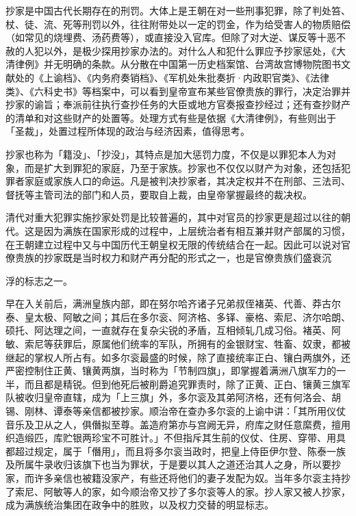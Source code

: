 抄家是中国古代长期存在的刑罚。大体上是王朝在对一些刑事犯罪，除了判处笞、杖、徒、流、死等刑罚以外，往往附带处以一定的罚金，作为给受害人的物质赔偿（如常见的烧埋费、汤药费等），或直接没入官库。但除了对大逆、谋反等十恶不赦的人犯以外，是极少探用抄家办法的。对什么人和犯什么罪应予抄家惩处，《大清律例》并无明确的条款。从分散在中国第一历史档案馆、台湾故宫博物院图书文献处的《上谕档》、《内务府奏销档》、《军机处朱批奏折·内政职官类》、《法律类》、《六科史书》等档案中，可以看到皇帝宣布某些官僚贵族的罪行，决定治罪并抄家的谕旨；奉派前往执行查抄任务的大臣或地方官奏报查抄经过；还有查抄财产的清单和对这些财产的处置等。处理方式有些是依据《大清律例》，有些则出于「圣裁」，处置过程所体现的政治与经济因素，值得思考。

抄家也称为「籍没」、「抄没」，其特点是加大惩罚力度，不仅是以罪犯本人为对象，而是扩大到罪犯的家庭，乃至于家族。抄家也不仅仅以财产为对象，还包括犯罪者家庭或家族人口的命运。凡是被判决抄家者，其决定权并不在刑部、三法司、督抚等主管司法的部门和人员，要取自上裁，由皇帝掌握最终的裁决权。

清代对重大犯罪实施抄家处罚是比较普遍的，其中对官员的抄家更是超过以往的朝代。这是因为满族在国家形成的过程中，上层统治者有相互兼并财产部属的习惯，在王朝建立过程中又与中国历代王朝皇权无限的传统结合在一起。因此可以说对官僚贵族的抄家既是当时权力和财产再分配的形式之一，也是官僚贵族们盛衰沉

\vfill
\begin{BookNotes}
\end{BookNotes}

\noindent 浮的标志之一。

早在入关前后，满洲皇族内部，即在努尔哈齐诸子兄弟叔侄褚英、代善、莽古尔泰、皇太极、阿敏之间；其后在多尔衮、阿济格、多铎、豪格、索尼、济尔哈朗、硕托、阿达理之间，一直就存在复杂尖锐的矛盾，互相倾轧几成习俗。褚英、阿敏、索尼等获罪后，原属他们统率的军队，所拥有的金银财宝、牲畜、奴隶，都被继起的掌权人所占有。如多尔衮最盛的时候，除了直接统率正白、镶白两旗外，还严密控制住正黄、镶黄两旗，当时称为「节制四旗」，即掌握着满洲八旗军力的一半，而且都是精锐。但到他死后被削爵追究罪责时，除了正黄、正白、镶黄三旗军队被收归皇帝直辖，成为「上三旗」外，多尔衮及其弟阿济格，还有何洛会、胡锡、刚林、谭泰等亲信都被抄家。顺治帝在查办多尔衮的上谕中讲：「其所用仪仗音乐及卫从之人，俱僭拟至尊。盖造府第亦与宫阙无异，府库之财任意縻费，擅用织造缎匹，库贮银两珍宝不可胜计。」不但指斥其生前的仪仗、住房、穿带、用具都超过规定，属于「僭用」，而且将多尔衮当政时，把皇上侍臣伊尔登、陈泰一族及所属牛录收归该旗下也当为罪状，于是要以其人之道还治其人之身，所以要抄家，而许多亲信也被籍没家产，有些还将他们的妻子发配为奴。当年多尔衮主持抄了索尼、阿敏等人的家，如今顺治帝又抄了多尔衮等人的家。抄人家又被人抄家，成为满族统治集团在政争中的胜败，以及权力交替的明显标志。

